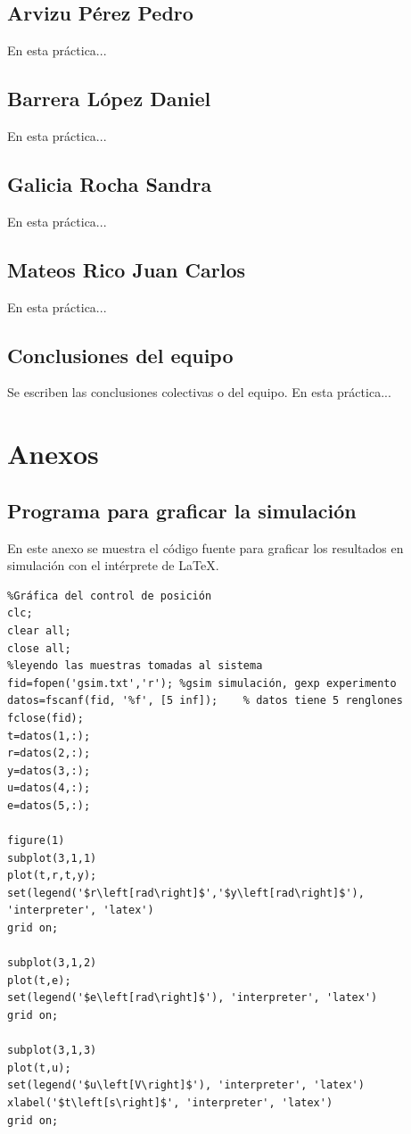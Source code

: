 \documentclass{article}
\begin{document}
\subsection{Arvizu Pérez Pedro}
En esta práctica...
 

\subsection{Barrera López Daniel}
En esta práctica...

\subsection{Galicia Rocha Sandra}
En esta práctica...

\subsection{Mateos Rico Juan Carlos}
 En esta práctica...
 
\subsection{Conclusiones del equipo}
Se escriben las conclusiones colectivas o del equipo. En esta práctica...




\vspace{10 mm}

\newpage
\section{Anexos}

\subsection{Programa para graficar la simulación}\label{proggsim}
En este anexo se muestra el código fuente para graficar los resultados en simulación con el intérprete de LaTeX.
{\scriptsize
\begin{verbatim}
%Gráfica del control de posición
clc;
clear all;
close all;
%leyendo las muestras tomadas al sistema
fid=fopen('gsim.txt','r'); %gsim simulación, gexp experimento
datos=fscanf(fid, '%f', [5 inf]);    % datos tiene 5 renglones
fclose(fid);
t=datos(1,:); 
r=datos(2,:);
y=datos(3,:);
u=datos(4,:);
e=datos(5,:);

figure(1)
subplot(3,1,1)
plot(t,r,t,y);
set(legend('$r\left[rad\right]$','$y\left[rad\right]$'), 'interpreter', 'latex')
grid on;

subplot(3,1,2)
plot(t,e);
set(legend('$e\left[rad\right]$'), 'interpreter', 'latex')
grid on;

subplot(3,1,3)
plot(t,u);
set(legend('$u\left[V\right]$'), 'interpreter', 'latex')
xlabel('$t\left[s\right]$', 'interpreter', 'latex')
grid on;
\end{verbatim}
}
\end{document}
